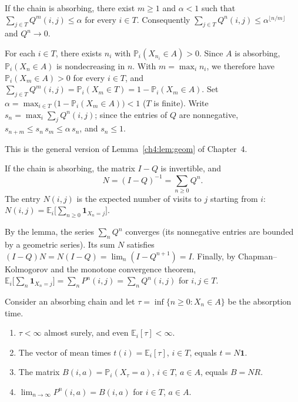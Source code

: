 \begin{lemma}\label{appB:lem:geom}
If the chain is absorbing, there exist $m\ge1$ and $\alpha<1$ such that $\sum_{j\in T}Q^m(i,j)\le\alpha$ for every $i\in
T$. Consequently $\sum_{j\in T}Q^n(i,j)\le\alpha^{\lfloor n/m\rfloor}$ and $Q^n\to0$.
\end{lemma}

\begin{humanproof}
For each $i\in T$, there exists $n_i$ with $\mathbb P_i(X_{n_i}\in A)>0$. Since $A$ is absorbing, $\mathbb P_i(X_n\in
A)$ is nondecreasing in $n$. With $m=\max_in_i$, we therefore have $\mathbb P_i(X_m\in A)>0$ for every $i\in T$, and
$\sum_{j\in T}Q^m(i,j)=\mathbb P_i(X_m\in T)=1-\mathbb P_i(X_m\in A)$. Set $\alpha=\max_{i\in T}\bigl(1-\mathbb P_i(X_m\in
A)\bigr)<1$ ($T$ is finite). Write $s_n=\max_i\sum_jQ^n(i,j)$; since the entries of $Q$ are nonnegative,
$s_{n+m}\le s_n\,s_m\le\alpha\,s_n$, and $s_n\le1$.
\end{humanproof}

This is the general version of Lemma~\ref{ch4:lem:geom} of Chapter~4.

\begin{theorem}\label{appB:thm:fond}
If the chain is absorbing, the matrix $I-Q$ is invertible, and
\[N=(I-Q)^{-1}=\sum_{n\ge0}Q^n .\]
The entry $N(i,j)$ is the expected number of visits to $j$ starting from $i$: $N(i,j)=\mathbb
E_i\bigl[\sum_{n\ge0}\mathbf 1_{X_n=j}\bigr]$.
\end{theorem}

\begin{humanproof}
By the lemma, the series $\sum_nQ^n$ converges (its nonnegative entries are bounded by a geometric series).
Its sum $N$ satisfies $(I-Q)N=N(I-Q)=\lim_n(I-Q^{n+1})=I$. Finally, by Chapman--Kolmogorov and the monotone
convergence theorem, $\mathbb E_i\bigl[\sum_n\mathbf 1_{X_n=j}\bigr]=\sum_nP^n(i,j)=\sum_nQ^n(i,j)$ for $i,j\in T$.
\end{humanproof}

\begin{theorem}\label{appB:thm:absorption}
Consider an absorbing chain and let $\tau=\inf\{n\ge0:X_n\in A\}$ be the absorption time.
\begin{enumerate}
\item $\tau<\infty$ almost surely, and even $\mathbb E_i[\tau]<\infty$.
\item The vector of mean times $t(i)=\mathbb E_i[\tau]$, $i\in T$, equals $t=N\mathbf 1$.
\item The matrix $B(i,a)=\mathbb P_i(X_\tau=a)$, $i\in T$, $a\in A$, equals $B=NR$.
\item $\lim_{n\to\infty}P^n(i,a)=B(i,a)$ for $i\in T$, $a\in A$.
\end{enumerate}
\end{theorem}

